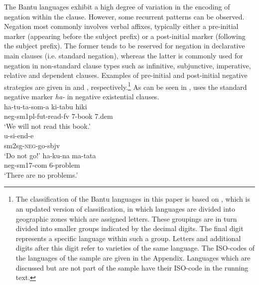 \documentclass[output=paper]{langscibook}
\begin{document}
The Bantu languages exhibit a high degree of variation in the encoding of
negation within the clause. However, some recurrent patterns can be
observed. Negation most commonly involves verbal affixes, typically either
a pre-initial marker (appearing before the subject prefix) or a
post-initial marker (following the subject prefix). The former tends to be
reserved for negation in declarative main clauses (i.e. standard negation),
whereas the latter is commonly used for negation in non-standard clause
types such as infinitive, subjunctive, imperative, relative and dependent
clauses. Examples of pre-initial and post-initial negative strategies are
given in  and ,
respectively.\footnote{The classification of the Bantu languages in this
paper is based on \citet{Maho2009}, which is an updated
version of  classification, in
which languages are divided into geographic zones which are assigned
letters. These groupings are in turn divided into smaller groups indicated
by the decimal digits. The final digit represents a specific language
within such a group. Letters and additional digits after this digit refer
to varieties of the same language. The ISO-codes of the languages of the
sample are given in  the Appendix. Languages which are
discussed but are not part of the sample have their ISO-code in the running
text.} As can be seen in ,  uses the
standard negative marker {\it ha-} in negative existential clauses.
\ea\label{ex:swahili-read-go-problem} \\
\ea\label{ex:swahili-read} 
\gll ha-tu-ta-som-a ki-tabu hiki\\ 
{\sc neg-sm}1pl-{\sc fut}-read-{\sc fv} 7-book 7.{\sc dem}\\ 
\glt `We will not read this book.'\\ 
\ex\label{ex:swahili-go} 
\gll u-si-end-e\\ 
{\sc sm2}sg-\textsc{neg}-go-{\sc sbjv}\\ 
\glt `Do not go!' 
\ex\label{ex:swahili-problem}
\gll ha-ku-na ma-tata\\ 
{\sc neg-sm17-com} 6-problem\\ 
\glt `There are no problems.' \z\z
\end{document}
